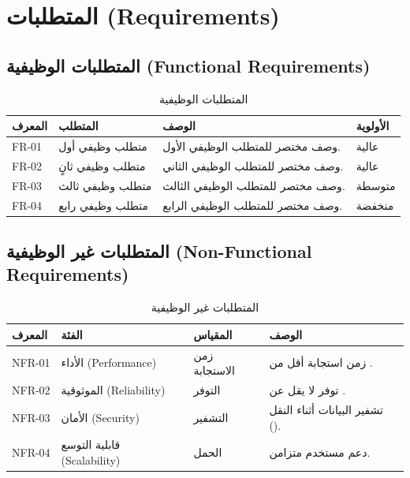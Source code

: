 \documentclass[11pt,a4paper]{article}
\begin{document}
\section{المتطلبات (Requirements)}
\label{sec:requirements}

\subsection{المتطلبات الوظيفية (Functional Requirements)}
\begin{table}[H]
\centering
\caption{المتطلبات الوظيفية}
\renewcommand{\arraystretch}{1.3}
\begin{tabularx}{\textwidth}{C{1.2cm} L{4cm} X L{2.5cm}}
\toprule
\textbf{المعرف} & \textbf{المتطلب} & \textbf{الوصف} & \textbf{الأولوية} \\
\midrule
FR-01 & متطلب وظيفي أول & وصف مختصر للمتطلب الوظيفي الأول. & عالية \\
FR-02 & متطلب وظيفي ثانٍ & وصف مختصر للمتطلب الوظيفي الثاني. & عالية \\
FR-03 & متطلب وظيفي ثالث & وصف مختصر للمتطلب الوظيفي الثالث. & متوسطة \\
FR-04 & متطلب وظيفي رابع & وصف مختصر للمتطلب الوظيفي الرابع. & منخفضة \\
\bottomrule
\end{tabularx}
\end{table}

\subsection{المتطلبات غير الوظيفية (Non-Functional Requirements)}
\begin{table}[H]
\centering
\caption{المتطلبات غير الوظيفية}
\renewcommand{\arraystretch}{1.3}
\begin{tabularx}{\textwidth}{C{1.2cm} L{3cm} L{2.5cm} X}
\toprule
\textbf{المعرف} & \textbf{الفئة} & \textbf{المقياس} & \textbf{الوصف} \\
\midrule
NFR-01 & الأداء (Performance) & زمن الاستجابة & زمن استجابة أقل من . \\
NFR-02 & الموثوقية (Reliability) & التوفر & توفر لا يقل عن . \\
NFR-03 & الأمان (Security) & التشفير & تشفير البيانات أثناء النقل (). \\
NFR-04 & قابلية التوسع (Scalability) & الحمل & دعم  مستخدم متزامن. \\
\bottomrule
\end{tabularx}
\end{table}
\end{document}
